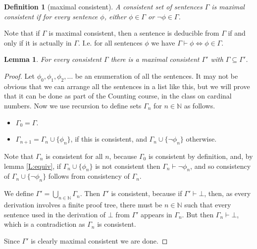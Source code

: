 \documentclass{article}
\theoremstyle{plain}
\newtheorem{definition}[theorem]{Definition}{\bfseries}{\upshape}
\newtheorem{lemma}[theorem]{Lemma}{\bfseries}{\upshape}
\newcommand{\bN}{\mathbb{N}}
\begin{document}
\begin{definition}[maximal consistent]
A consistent set of sentences $\Gamma$ is maximal consistent if for every sentence $\phi$, either $\phi\in\Gamma$ or $\neg\phi\in \Gamma$.
\end{definition}

Note that if $\Gamma$ is maximal consistent, then a sentence is deducible from $\Gamma$ if and only if it is actually in $\Gamma$. I.e. for all sentences $\phi$ we have $\Gamma\vdash \phi \iff \phi\in \Gamma$.

\begin{lemma}\label{L:max}
For every consistent $\Gamma$ there is a maximal consistent $\Gamma'$ with $\Gamma\subseteq \Gamma'$.
\end{lemma}
\begin{proof}
Let $\phi_0,\phi_1,\phi_2,\ldots$ be an enumeration of all the sentences. It may not be obvious that we can arrange all the sentences in a list like this, but we will prove that it can be done as part of the Counting course, in the class on cardinal numbers. Now we use recursion to define sets $\Gamma_n$ for $n\in\bN$ as follows.
\begin{itemize}
\item $\Gamma_0 = \Gamma$.
\item $\Gamma_{n+1} = \Gamma_n\cup\{\phi_n\}$, if this is consistent, and $\Gamma_n\cup\{\neg\phi_n\}$ otherwise.
\end{itemize}
Note that $\Gamma_n$ is consistent for all $n$, because $\Gamma_0$ is consistent by definition, and, by lemma \ref{L:equiv}, if $\Gamma_{n}\cup\{\phi_n\}$ is not consistent then $\Gamma_{n}\vdash \neg\phi_n$, and so consistency of $\Gamma_{n}\cup\{\neg\phi_n\}$ follows from consistency of $\Gamma_{n}$.

We define $\Gamma'=\bigcup_{n\in\bN} \Gamma_n$. Then $\Gamma'$ is consistent, because if $\Gamma'\vdash \bot$, then, as every derivation involves a finite proof tree, there must be $n\in\bN$ such that every sentence used in the derivation of $\bot$ from $\Gamma'$ appears in $\Gamma_n$. But then $\Gamma_n\vdash \bot$, which is a contradiction as $\Gamma_n$ is consistent.

Since $\Gamma'$ is clearly maximal consistent we are done. 
\end{proof}
\end{document}
